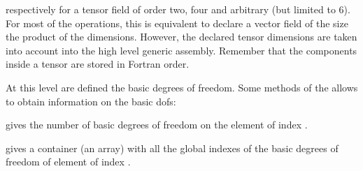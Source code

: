 \documentclass[a4paper,11pt,english]{sphinxmanual}
\begin{document}
\begin{sphinxVerbatim}[commandchars=\\\{\}]
   
       
  
\end{sphinxVerbatim}

respectively for a tensor field of order two, four and arbitrary (but limited to 6). For most of the operations, this is equivalent to declare a vector field of the size the product of the dimensions. However, the declared tensor dimensions are taken into account into the high level generic assembly. Remember that the components inside a tensor are stored in Fortran order.

At this level are defined the basic degrees of freedom. Some methods of the
 allows to obtain information on the basic dofs:

\begin{fulllineitems}
\label{\detokenize{userdoc/bfem:_CPPv4N6getfem8mesh_fem23nb_basic_dof_of_elementE1i}}%
\pysigstartmultiline
{}%
\pysigstopmultiline
gives the number of basic degrees of freedom on the element of index .

\end{fulllineitems}


\begin{fulllineitems}
\label{\detokenize{userdoc/bfem:_CPPv4N6getfem8mesh_fem24ind_basic_dof_of_elementE1i}}%
\pysigstartmultiline
{}%
\pysigstopmultiline
gives a container (an array) with all the global indexes of the basic degrees
of freedom of element of index .

\end{fulllineitems}
\end{document}
